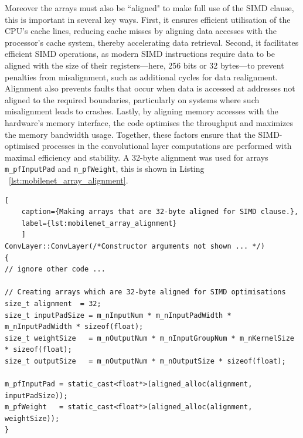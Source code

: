 Moreover the arrays must also be ``aligned" to make full use of the SIMD clause, this is important in several key ways. First, it ensures efficient utilisation of the CPU's cache lines, reducing cache misses by aligning data accesses with the processor’s cache system, thereby accelerating data retrieval. Second, it facilitates efficient SIMD operations, as modern SIMD instructions require data to be aligned with the size of their registers—here, 256 bits or 32 bytes—to prevent penalties from misalignment, such as additional cycles for data realignment. Alignment also prevents faults that occur when data is accessed at addresses not aligned to the required boundaries, particularly on systems where such misalignment leads to crashes. Lastly, by aligning memory accesses with the hardware's memory interface, the code optimises the throughput and maximizes the memory bandwidth usage. Together, these factors ensure that the SIMD-optimised processes in the convolutional layer computations are performed with maximal efficiency and stability\cite{simd_array_alignment}. A 32-byte alignment was used for arrays \texttt{m\_pfInputPad} and  \texttt{m\_pfWeight}, this is shown in Listing  ~\ref{lst:mobilenet_array_alignment}.

\begin{lstlisting}[
	caption={Making arrays that are 32-byte aligned for SIMD clause.},
	label={lst:mobilenet_array_alignment}
	]
ConvLayer::ConvLayer(/*Constructor arguments not shown ... */) 
{
// ignore other code ... 

// Creating arrays which are 32-byte aligned for SIMD optimisations 
size_t alignment  = 32;
size_t inputPadSize = m_nInputNum * m_nInputPadWidth * m_nInputPadWidth * sizeof(float);
size_t weightSize   = m_nOutputNum * m_nInputGroupNum * m_nKernelSize * sizeof(float);
size_t outputSize   = m_nOutputNum * m_nOutputSize * sizeof(float);

m_pfInputPad = static_cast<float*>(aligned_alloc(alignment, inputPadSize));
m_pfWeight   = static_cast<float*>(aligned_alloc(alignment, weightSize));
}
\end{lstlisting}

